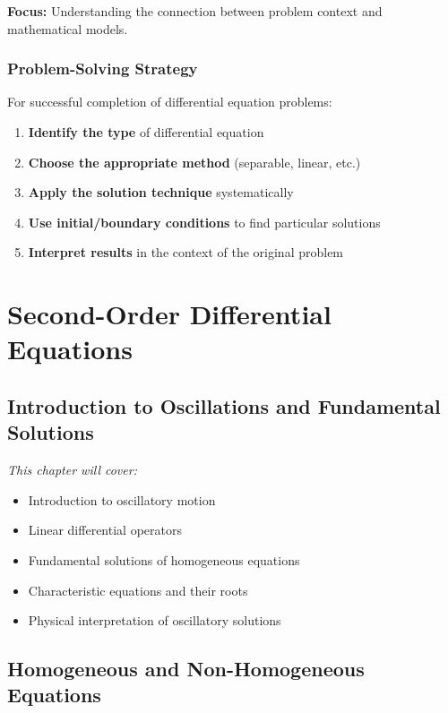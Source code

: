 \documentclass[12pt, letterpaper]{book}
\begin{document}
\textbf{Focus:} Understanding the connection between problem context and mathematical models.

\section{Problem-Solving Strategy}
For successful completion of differential equation problems:
\begin{enumerate}
    \item \textbf{Identify the type} of differential equation
    \item \textbf{Choose the appropriate method} (separable, linear, etc.)
    \item \textbf{Apply the solution technique} systematically
    \item \textbf{Use initial/boundary conditions} to find particular solutions
    \item \textbf{Interpret results} in the context of the original problem
\end{enumerate}

\part{Second-Order Differential Equations}
\label{part:second_order_de}

\chapter{Introduction to Oscillations and Fundamental Solutions}
\label{chap:session_5}

\textit{This chapter will cover:}
\begin{itemize}
    \item Introduction to oscillatory motion
    \item Linear differential operators
    \item Fundamental solutions of homogeneous equations
    \item Characteristic equations and their roots
    \item Physical interpretation of oscillatory solutions
\end{itemize}

\chapter{Homogeneous and Non-Homogeneous Equations}
\label{chap:session_6}
\end{document}
